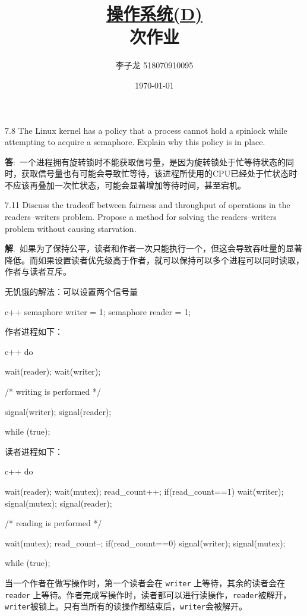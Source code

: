 \documentclass[12pt,a4paper]{article}
\newenvironment{problems}{\begin{list}{}{\renewcommand{\makelabel}[1]{\textbf{##1}\hfil}}}{\end{list}}
\providecommand{\ans}{\textbf{答}:~}
\providecommand{\sol}{\textbf{解}.~}
\begin{document}
\title{\normalsize \underline{操作系统(D)}\\ 次作业}
\author{李子龙 518070910095}
\date{\today}
\maketitle

\begin{problems}
    \item[7.8] The Linux kernel has a policy that a process cannot hold a spinlock while attempting to acquire a semaphore. Explain why this policy is in place.
    
    \ans 一个进程拥有旋转锁时不能获取信号量，是因为旋转锁处于忙等待状态的同时，获取信号量也有可能会导致忙等待，该进程所使用的CPU已经处于忙状态时不应该再叠加一次忙状态，可能会显著增加等待时间，甚至宕机。
    \item[7.11] Discuss the tradeoff between fairness and throughput of operations in the readers–writers problem. Propose a method for solving the readers–writers problem without causing starvation.
    
    \sol 如果为了保持公平，读者和作者一次只能执行一个，但这会导致吞吐量的显著降低。而如果设置读者优先级高于作者，就可以保持可以多个进程可以同时读取，作者与读者互斥。

    无饥饿的解法：可以设置两个信号量
    \begin{code}{c++}
        semaphore writer = 1;
        semaphore reader = 1;
    \end{code}
    作者进程如下：
    \begin{code}{c++}
    do{
        wait(reader);
        wait(writer);

        /* writing is performed */

        signal(writer);
        signal(reader);
    } while (true);
    \end{code}
    读者进程如下：
    \begin{code}{c++}
    do{
        wait(reader);
        wait(mutex);
        read_count++;
        if(read_count==1)
            wait(writer);
        signal(mutex);
        signal(reader);

        /* reading is performed */

        wait(mutex);
        read_count--;
        if(read_count==0)
            signal(writer);
        signal(mutex);
    } while (true);
    \end{code}
    
    当一个作者在做写操作时，第一个读者会在 \verb"writer" 上等待，其余的读者会在\verb"reader" 上等待。作者完成写操作时，读者都可以进行读操作，\verb"reader"被解开，\verb"writer"被锁上。只有当所有的读操作都结束后，\verb"writer"会被解开。


\end{problems}
\end{document}
